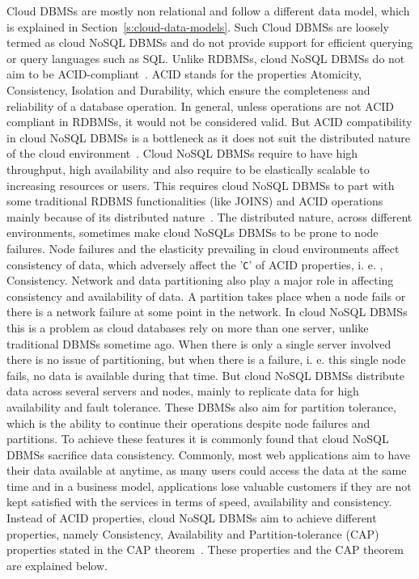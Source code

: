 Cloud \acp{DBMS} are mostly non relational and follow a different data model,
which is explained in Section~\ref{s:cloud-data-models}.  Such Cloud \acp{DBMS}
are loosely termed as cloud \ac{NoSQL} \acp{DBMS} and do not provide support for
efficient querying or query languages such as SQL. Unlike \acp{RDBMS}, cloud
\ac{NoSQL} \acp{DBMS} do not aim to be
ACID-compliant~\citep{Florescu,Han,Stonebraker2,Stonebraker}.
ACID stands for the properties Atomicity,   Consistency,   Isolation and
Durability, which ensure the completeness and reliability of a database
operation.  In general,   unless operations are not ACID compliant in
\acp{RDBMS},   it would not be considered valid. But ACID compatibility in cloud
\ac{NoSQL} \acp{DBMS} is a bottleneck as it does not suit the distributed nature
of the cloud environment~\citep{Stonebraker2,Wada}.
Cloud \ac{NoSQL} \acp{DBMS} require to have high throughput,   high availability
and also require to be elastically scalable to increasing resources or users.
This requires cloud \ac{NoSQL} \acp{DBMS} to part with some traditional
\ac{RDBMS} functionalities (like JOINS) and ACID operations mainly because of
its distributed nature~\citep{Wada}.  The distributed nature, across different
environments, sometimes make cloud \acp{NoSQL} \acp{DBMS} to be prone to node
failures.  Node failures and the elasticity prevailing in cloud environments
affect consistency of data,   which adversely affect the '\texttt{C}' of ACID
properties,   i. e. ,
  Consistency.  Network and data partitioning also play a major role in
affecting consistency and availability of data.   A partition takes place when a
node fails or there is a network failure at some point in the network.  In cloud
\ac{NoSQL} \acp{DBMS} this is a problem as cloud databases rely on more than one
server,   unlike traditional \acp{DBMS} sometime ago.  When there is only a
single server involved there is no issue of partitioning,   but when there is a
failure,   i. e.  this single node fails, no data is available during that time.
 But cloud \ac{NoSQL} \acp{DBMS} distribute data across several servers and
nodes,   mainly to replicate data for high availability and fault tolerance.
These \acp{DBMS} also aim for partition tolerance,   which is the ability to
continue their operations despite node failures and partitions.  To achieve
these features it is commonly found that cloud \ac{NoSQL} \acp{DBMS} sacrifice
data consistency.  Commonly,   most web applications aim to have their data
available at anytime,   as many users could access the data at the same time and
in a business model,   applications lose valuable customers if they are not kept
satisfied with the services in terms of speed,   availability and consistency.
Instead of ACID properties,   cloud \ac{NoSQL} \acp{DBMS} aim to achieve
different properties,   namely Consistency,   Availability and
Partition-tolerance (CAP) properties stated in the CAP
theorem~\citep{Gilbert,Ramakrishnan,Wada}.
These properties and the CAP theorem are explained below.

